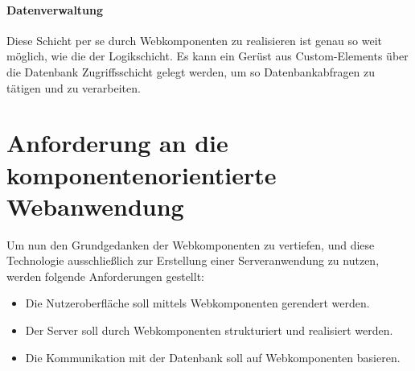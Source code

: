 \paragraph{Datenverwaltung}Diese Schicht per se durch Webkomponenten zu realisieren ist genau so weit möglich, wie die der Logikschicht. Es kann ein Gerüst aus Custom-Elements über die Datenbank Zugriffsschicht gelegt werden, um so Datenbankabfragen zu tätigen und zu verarbeiten. 


\section{Anforderung an die komponentenorientierte Webanwendung}
Um nun den Grundgedanken der Webkomponenten zu vertiefen, und diese Technologie ausschließlich zur Erstellung einer Serveranwendung zu nutzen, werden folgende Anforderungen gestellt:
	\begin{itemize}
	\item Die Nutzeroberfläche soll mittels Webkomponenten gerendert werden.
	\item Der Server soll durch Webkomponenten strukturiert und realisiert werden.
	\item Die Kommunikation mit der Datenbank soll auf Webkomponenten basieren.
\end{itemize}

